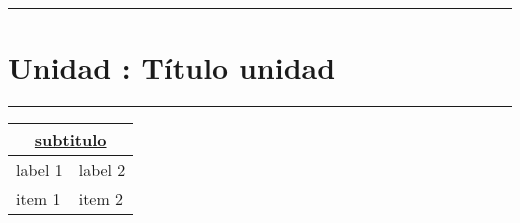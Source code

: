 \documentclass[../main.tex]{subfiles}
\begin{document}
\vspace{0.4in}
\hrule
\section{Unidad : Título unidad}
\hrule
\vspace{0.1in}
\begin{tabularx}{\textwidth}{|X|X|}
\hline
\multicolumn{2}{|c|}{\underline{\textbf{subtitulo}}} \\
\hline
  label 1 & label 2 \\
  \hline 
  item 1  & item 2  \\
  \hline
\end{tabularx}
\end{document}
